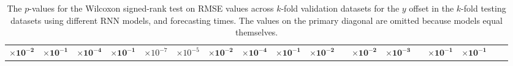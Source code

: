 \begin{table}[!ht]
{\begin{tabular}{|c|c|c|c|c|c|c|c|c|c|c|c|c|c|c|c|c|c|c|}
			$\mathbf{\times 10^{-2}}$ & $\mathbf{\times 10^{-1}}$ & $\mathbf{\times 10^{-4}}$ & $\mathbf{\times 10^{-1}}$ & $\times 10^{-7}$ & $\times 10^{-5}$ & $\mathbf{\times 10^{-2}}$ & $\mathbf{\times 10^{-4}}$ & $\mathbf{\times 10^{-1}}$ & $\mathbf{\times 10^{-2}}$ & & $\mathbf{\times 10^{-2}}$ & $\mathbf{\times 10^{-3}}$ & & $\mathbf{\times 10^{-1}}$ & $\mathbf{\times 10^{-1}}$ & & \multicolumn{2}{c}{} \\ \cline{1-17}
		\end{tabular}
	}
	\caption{The $p$-values for the Wilcoxon signed-rank test on RMSE values across $k$-fold validation datasets for the $y$ offset in the $k$-fold testing datasets using different RNN models, and forecasting times. The values on the primary diagonal are omitted because models equal themselves.}
	\label{tab:var_lat_RMSE}
\end{table}